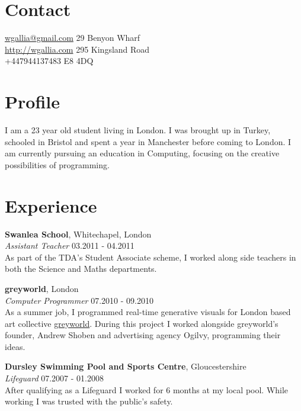 \documentclass[margin,line,a4paper]{resume}
\begin{document}
\begin{resume}

\section{\mysidestyle Contact}

\hypersetup{urlcolor=Fuchsia}
\href{mailto:wgallia@gmail.com}{wgallia@gmail.com}	\hfill 	29 Benyon Wharf   \\
\hypersetup{urlcolor=RoyalBlue}
\href{http://wgallia.com}{http://wgallia.com}		\hfill  295 Kingsland Road \\
+447944137483										\hfill	E8 4DQ \\

\section{\mysidestyle Profile}

I am a 23 year old student living in London. I was brought up in Turkey, schooled in Bristol and spent a year in Manchester before coming to London. I am currently pursuing an education in Computing, focusing on the creative possibilities of programming.

\section{\mysidestyle Experience}
\textbf{Swanlea School}, Whitechapel, London \vspace{1mm}\\
\textsl{Assistant Teacher} \hfill 03.2011 - 04.2011 \vspace{2mm} \\
As part of the TDA’s Student Associate scheme, I worked along side teachers in both the Science and Maths departments.

\textbf{greyworld}, London  \vspace{1mm}\\
\textsl{Computer Programmer} \hfill 07.2010 - 09.2010 \vspace{2mm} \\
As a summer job, I programmed real-time generative visuals for London based art collective \href{http://greyworld.org}{greyworld}. During this project I worked alongside greyworld’s founder, Andrew Shoben and advertising agency Ogilvy, programming their ideas.

\textbf{Dursley Swimming Pool and Sports Centre}, Gloucestershire  \vspace{1mm}\\
\textsl{Lifeguard} \hfill 07.2007 - 01.2008 \vspace{2mm} \\
After qualifying as a Lifeguard I worked for 6 months at my local pool. While working I was trusted with the public's safety.


\end{resume}
\end{document}
